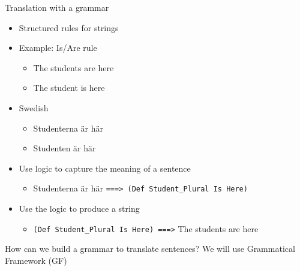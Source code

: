 \begin{frame}{Translation with a grammar} 
         \begin{itemize}
		   \item Structured rules for strings \pause
           \item Example: Is/Are rule \pause
           \begin{itemize}
             \item The students \textcolor{String}{are} here
             \item The student \textcolor{String}{is} here \pause
           \end{itemize}             
           \item Swedish
           \begin{itemize}
             \item Studenterna \textcolor{String}{{\"a}r} h{\"a}r
             \item Studenten \textcolor{String}{{\"a}r} h{\"a}r \pause
           \end{itemize}\pause
           \item Use logic to capture the meaning of a sentence\pause
           \begin{itemize}
             \item Studenterna {\"a}r h{\"a}r \texttt{===> (Def Student\_Plural\ Is Here)}\pause
           \end{itemize}
           \item Use the logic to produce a string\pause
           \begin{itemize}
             \item \texttt{(Def Student\_Plural Is Here) ===>} The students are here \pause
           \end{itemize}
         \end{itemize}
           \begin{block}{How can we build a grammar to translate sentences?}
              We will use Grammatical Framework (GF)
         \end{block}
\end{frame}
